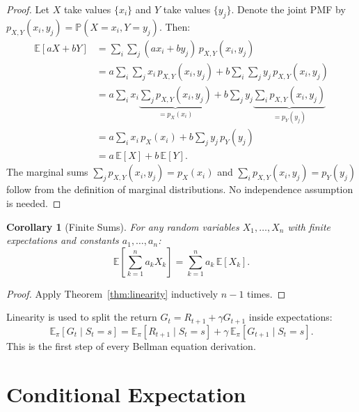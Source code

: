 \documentclass[11pt,a4paper]{article}
\theoremstyle{definition}
\theoremstyle{plain}
\newtheorem{corollary}[theorem]{Corollary}
\theoremstyle{remark}
\newcommand{\E}{\mathbb{E}}
\newcommand{\Prob}{\mathbb{P}}
\begin{document}
\begin{proof}
Let $X$ take values $\{x_i\}$ and $Y$ take values $\{y_j\}$. Denote the joint PMF by $p_{X,Y}(x_i, y_j) = \Prob(X = x_i, Y = y_j)$. Then:
\begin{align}
    \E[aX + bY]
    &= \sum_{i}\sum_{j} (a x_i + b y_j)\, p_{X,Y}(x_i, y_j) \nonumber\\
    &= a \sum_{i}\sum_{j} x_i\, p_{X,Y}(x_i, y_j) + b \sum_{i}\sum_{j} y_j\, p_{X,Y}(x_i, y_j) \nonumber\\
    &= a \sum_{i} x_i \underbrace{\sum_{j} p_{X,Y}(x_i, y_j)}_{= p_X(x_i)} + b \sum_{j} y_j \underbrace{\sum_{i} p_{X,Y}(x_i, y_j)}_{= p_Y(y_j)} \nonumber\\
    &= a \sum_{i} x_i\, p_X(x_i) + b \sum_{j} y_j\, p_Y(y_j) \nonumber\\
    &= a\,\E[X] + b\,\E[Y]. \label{eq:linearity_proof}
\end{align}
The marginal sums $\sum_j p_{X,Y}(x_i, y_j) = p_X(x_i)$ and $\sum_i p_{X,Y}(x_i, y_j) = p_Y(y_j)$ follow from the definition of marginal distributions. No independence assumption is needed.
\end{proof}

\begin{corollary}[Finite Sums]
\label{cor:linearity_sum}
For any random variables $X_1, \ldots, X_n$ with finite expectations and constants $a_1, \ldots, a_n$:
\begin{equation}
    \E\!\left[\sum_{k=1}^n a_k X_k\right] = \sum_{k=1}^n a_k\,\E[X_k].
    \label{eq:linearity_sum}
\end{equation}
\end{corollary}

\begin{proof}
Apply Theorem~\ref{thm:linearity} inductively $n-1$ times.
\end{proof}

\begin{tdconnection}
Linearity is used to split the return $G_t = R_{t+1} + \gamma G_{t+1}$ inside expectations:
\[
    \E_\pi[G_t \mid S_t = s] = \E_\pi[R_{t+1} \mid S_t = s] + \gamma\,\E_\pi[G_{t+1} \mid S_t = s].
\]
This is the first step of every Bellman equation derivation.
\end{tdconnection}

\section{Conditional Expectation}
\label{sec:conditional}
\end{document}
